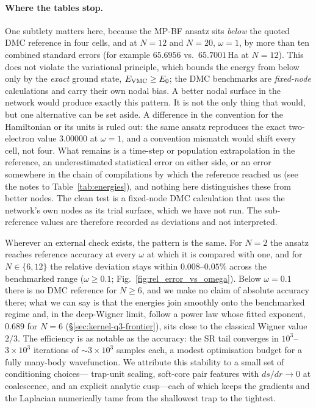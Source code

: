 \paragraph{Where the tables stop.}
One subtlety matters here, because the MP-BF ansatz sits \emph{below} the quoted DMC
reference in four cells, and at $N{=}12$ and $N{=}20$, $\omega=1$, by more than ten combined
standard errors (for example $65.6956$ vs.\ $65.7001$\,Ha at $N{=}12$). This does not violate
the variational principle, which bounds the energy from below only by the \emph{exact}
ground state, $E_{\rm VMC}\ge E_0$; the DMC benchmarks are \emph{fixed-node} calculations
and carry their own nodal bias. A better nodal surface in the network would produce exactly
this pattern. It is not the only thing that would, but one alternative can be set aside. A
difference in the convention for the Hamiltonian or its units is ruled out: the same ansatz
reproduces the exact two-electron value $3.00000$ at $\omega=1$, and a convention mismatch
would shift every cell, not four. What remains is a time-step or population extrapolation in
the reference, an underestimated statistical error on either side, or an error somewhere in
the chain of compilations by which the reference reached us (see the notes to
Table~\ref{tab:energies}), and nothing here distinguishes these from better nodes. The clean test is a fixed-node DMC
calculation that uses the network's own nodes as its trial surface, which we have not run.
The sub-reference values are therefore recorded as deviations and not interpreted.

Wherever an external check exists, the pattern is the same. For $N{=}2$ the ansatz reaches reference
accuracy at every $\omega$ at which it is compared with one, and for $N\!\in\!\{6,12\}$
the relative deviation stays within $0.008$–$0.05\%$ across the benchmarked
range ($\omega\ge0.1$; Fig.~\ref{fig:rel_error_vs_omega}). Below $\omega=0.1$ there
is no DMC reference for $N\ge6$, and we make no claim of absolute accuracy there;
what we can say is that the energies join smoothly onto the benchmarked regime and, in
the deep-Wigner limit, follow a power law whose fitted exponent, $0.689$ for $N{=}6$
(\S\ref{sec:kernel-q3-frontier}), sits close to the classical Wigner value $2/3$. The efficiency is as notable as the accuracy: the SR
tail converges in $10^3$–$3\times10^3$ iterations of $\sim 3{\times}10^3$ samples
each, a modest optimisation budget for a fully many-body wavefunction. We attribute
this stability to a small set of conditioning choices---
trap-unit scaling, soft-core pair features with $ds/dr\!\to\!0$ at coalescence, and
an explicit analytic cusp---each of which keeps the gradients and the Laplacian
numerically tame from the shallowest trap to the tightest.

